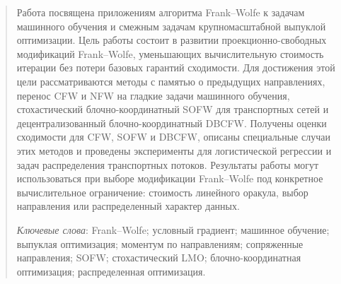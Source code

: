 \newpage

\begin{abstract}
Работа посвящена приложениям алгоритма Frank--Wolfe к задачам машинного обучения и смежным задачам крупномасштабной выпуклой оптимизации.
Цель работы состоит в развитии проекционно-свободных модификаций Frank--Wolfe, уменьшающих вычислительную стоимость итерации без потери базовых гарантий сходимости.
Для достижения этой цели рассматриваются методы с памятью о предыдущих направлениях, перенос CFW и NFW на гладкие задачи машинного обучения, стохастический блочно-координатный SOFW для транспортных сетей и децентрализованный блочно-координатный DBCFW.
Получены оценки сходимости для CFW, SOFW и DBCFW, описаны специальные случаи этих методов и проведены эксперименты для логистической регрессии и задач распределения транспортных потоков.
Результаты работы могут использоваться при выборе модификации Frank--Wolfe под конкретное вычислительное ограничение: стоимость линейного оракула, выбор направления или распределенный характер данных.

\smallskip
\textit{Ключевые слова}: Frank--Wolfe; условный градиент; машинное обучение; выпуклая оптимизация; моментум по направлениям; сопряженные направления; SOFW; стохастический LMO; блочно-координатная оптимизация; распределенная оптимизация.
\end{abstract}

